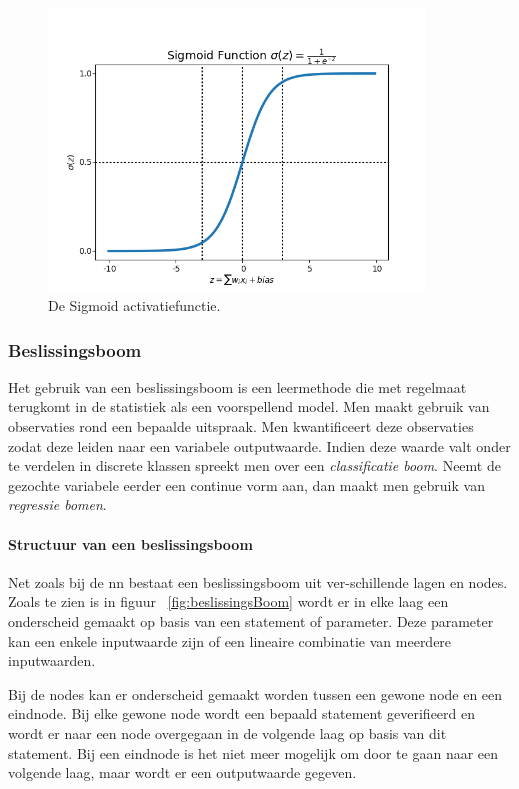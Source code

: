 			\begin{figure}
				\centering
				\includegraphics[width=100mm]{afbeeldingen/sigmoid2.PNG}
				\caption{De Sigmoid activatiefunctie\citep{bron:sigmoidfoto2}.}
				\label{fig:sigmoid}
			\end{figure}
	\subsubsection{Beslissingsboom} 
	Het gebruik van een beslissingsboom is een leermethode die met regelmaat terugkomt in de statistiek als een voorspellend model. Men maakt gebruik van observaties rond een bepaalde uitspraak. Men kwantificeert deze observaties zodat deze leiden naar een variabele outputwaarde. Indien deze waarde valt onder te verdelen in discrete klassen spreekt men over een \textit{classificatie boom}. Neemt de gezochte variabele eerder een continue vorm aan, dan maakt men gebruik van \textit{regressie bomen}.
	

	
		\paragraph{Structuur van een beslissingsboom}			
		Net zoals bij de \gls{nn} bestaat een beslissingsboom uit ver\hyp{}schillende lagen en nodes. Zoals te zien is in figuur ~\ref{fig:beslissingsBoom} wordt er in elke laag een onderscheid gemaakt op basis van een statement of parameter. Deze parameter kan een enkele inputwaarde zijn of een lineaire combinatie van meerdere inputwaarden. 
		
		Bij de nodes kan er onderscheid gemaakt worden tussen een gewone node en een eindnode. Bij elke gewone node wordt een bepaald statement geverifieerd en wordt er naar een node overgegaan in de volgende laag op basis van dit statement. Bij een eindnode is het niet meer mogelijk om door te gaan naar een volgende laag, maar wordt er een outputwaarde gegeven.
		
